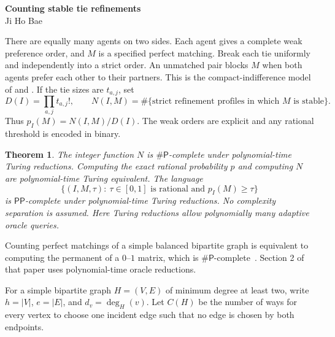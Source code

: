 \documentclass[11pt]{article}
\newtheorem{theorem}{Theorem}
\newcommand{\PP}{\mathsf{PP}}
\newcommand{\sharpP}{\mathsf{\#P}}
\begin{document}
\begin{center}
{\Large\bfseries Counting stable tie refinements}\\[5pt]
{\small Ji Ho Bae}
\end{center}

There are equally many agents on two sides. Each agent gives a complete
weak preference order, and $M$ is a specified perfect matching.
Break each tie uniformly and independently into a strict order.
An unmatched pair blocks $M$ when both agents prefer each other to their
partners.
This is the compact-indifference model of
\cite[Section 3.1.2, Table 1]{survey} and
\cite[Sections 2 and 5, Table 3]{uncertain}.
If the tie sizes are $t_{a,j}$, set
\[
 D(I)=\prod_{a,j}t_{a,j}!,\qquad
 N(I,M)=\#\{\text{strict refinement profiles in which }M\text{ is stable}\}.
\]
Thus $p_I(M)=N(I,M)/D(I)$. The weak orders are explicit and any rational
threshold is encoded in binary.

\begin{theorem}\label{thm:classification}
The integer function $N$ is $\sharpP$-complete under polynomial-time
Turing reductions. Computing the exact rational probability $p$ and
computing $N$ are polynomial-time Turing equivalent.
The language
\[
 \{(I,M,\tau):\ \tau\in[0,1]\text{ is rational and }p_I(M)\geq\tau\}
\]
is $\PP$-complete under polynomial-time Turing reductions.
No complexity separation is assumed. Here Turing reductions allow
polynomially many adaptive oracle queries.
\end{theorem}

Counting perfect matchings of a simple balanced bipartite graph is equivalent
to computing the permanent of a $0$--$1$ matrix, which is
$\sharpP$-complete~\cite[Theorem 1]{valiant}. Section 2 of that paper
uses polynomial-time oracle reductions.

For a simple bipartite graph $H=(V,E)$ of minimum degree at least two,
write $h=|V|$, $e=|E|$, and $d_v=\deg_H(v)$.
Let $C(H)$ be the number of ways for every vertex to choose one incident
edge such that no edge is chosen by both endpoints.
\end{document}
